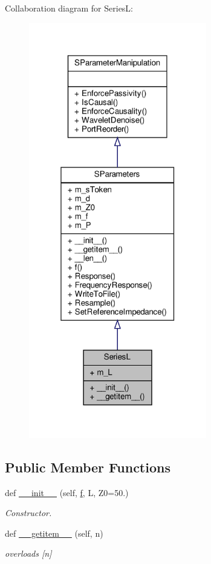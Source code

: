 Collaboration diagram for SeriesL\+:
\nopagebreak
\begin{figure}[H]
\begin{center}
\leavevmode
\includegraphics[width=220pt]{classSignalIntegrity_1_1SParameters_1_1Devices_1_1SeriesL_1_1SeriesL__coll__graph}
\end{center}
\end{figure}
\subsection*{Public Member Functions}
\begin{DoxyCompactItemize}
\item 
def \hyperlink{classSignalIntegrity_1_1SParameters_1_1Devices_1_1SeriesL_1_1SeriesL_ad506006bc5bc92f9e3fdb69c52d64eba}{\+\_\+\+\_\+init\+\_\+\+\_\+} (self, \hyperlink{classSignalIntegrity_1_1SParameters_1_1SParameters_1_1SParameters_a32e7a34d6837fe949b413c852a0447f8}{f}, L, Z0=50.)
\begin{DoxyCompactList}\small\item\em Constructor. \end{DoxyCompactList}\item 
def \hyperlink{classSignalIntegrity_1_1SParameters_1_1Devices_1_1SeriesL_1_1SeriesL_ab7a6da5139e0878b590d68292aaa70f2}{\+\_\+\+\_\+getitem\+\_\+\+\_\+} (self, n)
\begin{DoxyCompactList}\small\item\em overloads \mbox{[}n\mbox{]} \end{DoxyCompactList}\end{DoxyCompactItemize}


